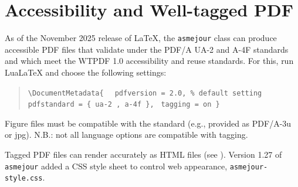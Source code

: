 \documentclass[balance,nocopyright,upint,varvw,hyphenate,barcolor=Goldenrod3,german]{asmejour}%
\newcommand*\LuaLaTeX{Lua\LaTeX}
\begin{document}

\section{Accessibility and Well-tagged PDF}\label{app:wtpdf}
As of the November 2025 release of \LaTeX, the \texttt{asmejour} class can produce accessible PDF files that validate under
the PDF/A UA-2 and A-4F standards and which meet the WTPDF 1.0 accessibility and reuse standards. For this, run \LuaLaTeX{} and choose the following settings:
 \begin{quote}
	\verb|\DocumentMetadata{ | \newline
	\verb| pdfversion = 2.0, % default setting | \newline
	\verb| pdfstandard = { ua-2 , a-4f },| \newline
	\verb| tagging = on }|
\end{quote}
Figure files must be compatible with the standard (e.g., provided as PDF/A-3u or jpg). N.B.: not all language options are compatible with tagging.

Tagged PDF files can render accurately as HTML files (see ). Version 1.27 of \texttt{asmejour} added a CSS style sheet to control web appearance, \texttt{asmejour-style.css}.


\nocite{*} %




\end{document}
